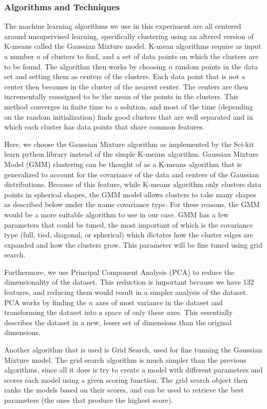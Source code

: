 \subsubsection{Algorithms and Techniques}
The machine learning algorithms we use in this experiment are all centered around unsupervised learning, specifically clustering using an altered version of K-means called the Gaussian Mixture model. K-mean algorithms require as input a number $n$ of clusters to find, and a set of data points on which the clusters are to be found. The algorithm then works by choosing $n$ random points in the data set and setting them as centers of the clusters. Each data point that is not a center then becomes in the cluster of the nearest center. The centers are then incrementally reassigned to be the mean of the points in the clusters. This method converges in finite time to a solution, and most of the time (depending on the random initialization) finds good clusters that are well separated and in which each cluster has data points that share common features. 

Here, we choose the Gaussian Mixture algorithm as implemented by the Sci-kit learn python library instead of the simple K-means algorithm. Gaussian Mixture Model (GMM) clustering can be thought of as a K-means algorithm that is generalized to account for the covariance of the data and centers of the Gaussian distributions. Because of this feature, while K-means algorithm only clusters data points in spherical shapes, the GMM model allows clusters to take many shapes as described below under the name covariance type. For these reasons, the GMM would be a more suitable algorithm to use in our case. GMM has a few parameters that could be tuned, the most important of which is the covariance type (full, tied, diagonal, or spherical) which dictates how the cluster edges are expanded and how the clusters grow. This parameter will be fine tuned using grid search. 

Furthermore, we use Principal Component Analysis (PCA) to reduce the dimensionality of the dataset. This reduction is important because we have 132 features, and reducing them would result in a simpler analysis of the dataset. PCA works by finding the $n$ axes of most variance in the dataset and transforming the dataset into a space of only these axes. This essentially describes the dataset in a new, lesser set of dimensions than the original dimensions.

Another algorithm that is used is Grid Search, used for fine tunning the Gaussian Mixture model. The grid search algorithm is much simpler than the previous algorithms, since all it does is try to create a model with different parameters and scores each model using a given scoring function. The grid search object then ranks the models based on their scores, and can be used to retrieve the best parameters (the ones that produce the highest score).

